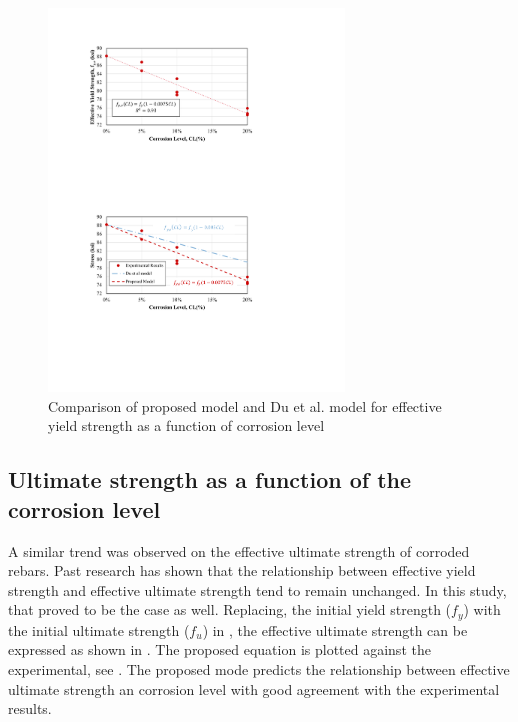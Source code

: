 \begin{figure}[htbp]
	\centering
	\includegraphics[width=0.7\textwidth]{VAC Thesis 2.0/Chapter-4/figs/TensionTest_results_3_proposedmodel.pdf}
	\caption{Comparison of proposed model and Du et al. model \cite{Du2005} for effective yield strength as a function of corrosion level}
	\label{fig:Calderon_vs_Du}
\end{figure}

\newpage

\subsection{Ultimate strength as a function of the corrosion level}

A similar trend was observed on the effective ultimate strength of corroded rebars. Past research has shown that the relationship between effective yield strength and effective ultimate strength tend to remain unchanged. In this study, that proved to be the case as well. Replacing, the initial yield strength ($f_y$) with the initial ultimate strength ($f_u$) in , the effective ultimate strength can be expressed as shown in . The proposed equation is plotted against the experimental, see . The proposed mode predicts the relationship between effective ultimate strength an corrosion level with good agreement with the experimental results.

